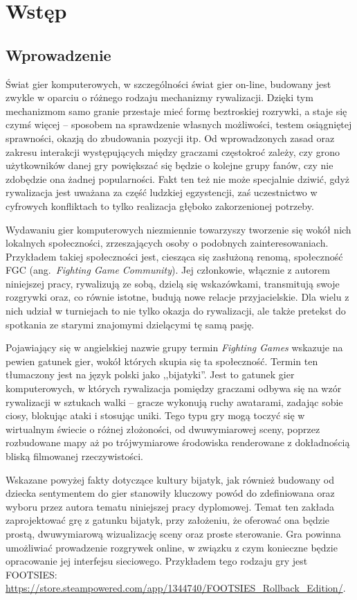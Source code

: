\chapter{Wstęp}
\section{Wprowadzenie}
Świat gier komputerowych, w szczególności świat gier on-line, budowany jest zwykle w oparciu o różnego rodzaju mechanizmy rywalizacji. Dzięki tym mechanizmom samo granie przestaje mieć formę beztroskiej rozrywki, a staje się czymś więcej -- sposobem na sprawdzenie własnych możliwości, testem osiągniętej sprawności, okazją do zbudowania pozycji itp. Od wprowadzonych zasad oraz zakresu interakcji występujących między graczami częstokroć zależy, czy grono użytkowników danej gry powiększać się będzie o kolejne grupy fanów, czy nie zdobędzie ona żadnej popularności. Fakt ten też nie może specjalnie dziwić, gdyż rywalizacja jest uważana za część ludzkiej egzystencji, zaś uczestnictwo w cyfrowych konfliktach to tylko realizacja głęboko zakorzenionej potrzeby.

Wydawaniu gier komputerowych niezmiennie towarzyszy tworzenie się wokół nich lokalnych społeczności, zrzeszających osoby o podobnych zainteresowaniach. Przykładem takiej społeczności jest, ciesząca się zasłużoną renomą, społeczność FGC (ang.~\emph{Fighting Game Community}). Jej członkowie, włącznie z autorem niniejszej pracy, rywalizują ze sobą, dzielą się wskazówkami, transmitują swoje rozgrywki oraz, co równie istotne, budują nowe relacje przyjacielskie. Dla wielu z nich udział w turniejach to nie tylko okazja do rywalizacji, ale także pretekst do spotkania ze starymi znajomymi dzielącymi tę samą pasję.

Pojawiający się w angielskiej nazwie grupy termin \emph{Fighting Games} wskazuje na pewien gatunek gier, wokół których skupia się ta społeczność. Termin ten tłumaczony jest na język polski jako ,,bijatyki''. Jest to gatunek gier komputerowych, w których rywalizacja pomiędzy graczami odbywa się na wzór rywalizacji w sztukach walki -- gracze wykonują ruchy awatarami, zadając sobie ciosy, blokując ataki i stosując uniki. Tego typu gry mogą toczyć się w wirtualnym świecie o różnej złożoności, od dwuwymiarowej sceny, poprzez rozbudowane mapy aż po trójwymiarowe środowiska renderowane z dokładnością bliską filmowanej rzeczywistości.

Wskazane powyżej fakty dotyczące kultury bijatyk, jak również budowany od dziecka sentymentem do gier stanowiły kluczowy powód do zdefiniowana oraz wyboru przez autora tematu niniejszej pracy dyplomowej. Temat ten zakłada zaprojektować grę z gatunku bijatyk, przy założeniu, że oferować ona będzie prostą, dwuwymiarową wizualizację sceny oraz proste sterowanie. Gra powinna umożliwiać prowadzenie rozgrywek online, w związku z czym konieczne będzie opracowanie jej interfejsu sieciowego. Przykładem tego rodzaju gry jest FOOTSIES: \url{https://store.steampowered.com/app/1344740/FOOTSIES_Rollback_Edition/}. 



